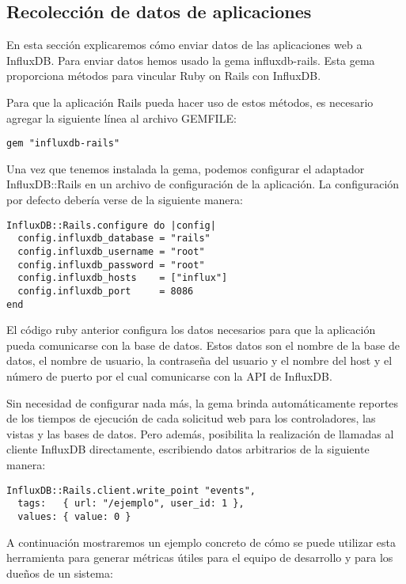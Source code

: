 \subsection{Recolección de datos de aplicaciones}
\label{aplicaciones}

En  esta sección explicaremos cómo enviar datos de las aplicaciones web a
InfluxDB.  Para enviar datos hemos usado la gema influxdb-rails.  Esta gema
proporciona métodos para vincular Ruby on Rails con InfluxDB.

Para que la aplicación Rails pueda hacer uso de estos métodos, es necesario
agregar la siguiente línea al archivo GEMFILE:

\begin{lstlisting}
gem "influxdb-rails"
\end{lstlisting}

Una vez que tenemos instalada la gema, podemos configurar el adaptador
InfluxDB::Rails en un archivo de configuración de la aplicación. La
configuración por defecto debería verse de la siguiente manera:

\begin{lstlisting}
InfluxDB::Rails.configure do |config|
  config.influxdb_database = "rails"
  config.influxdb_username = "root"
  config.influxdb_password = "root"
  config.influxdb_hosts    = ["influx"]
  config.influxdb_port     = 8086
end
\end{lstlisting}

El código ruby anterior configura los datos necesarios para que la aplicación pueda comunicarse con la base de datos. Estos datos son el nombre de la base de datos, el nombre de usuario, la contraseña del usuario y el nombre del host y el número de puerto por el cual comunicarse con la API de InfluxDB.

Sin necesidad de configurar nada más, la gema brinda automáticamente reportes de los tiempos de ejecución de cada solicitud web para los controladores, las vistas y las bases de datos. Pero además, posibilita la realización de llamadas al cliente InfluxDB directamente, escribiendo datos arbitrarios de la siguiente manera:

\begin{lstlisting}
InfluxDB::Rails.client.write_point "events",
  tags:   { url: "/ejemplo", user_id: 1 },
  values: { value: 0 }
\end{lstlisting}

A continuación mostraremos un ejemplo concreto de cómo se puede utilizar esta herramienta para generar métricas útiles para el equipo de desarrollo y para los dueños de un sistema:

